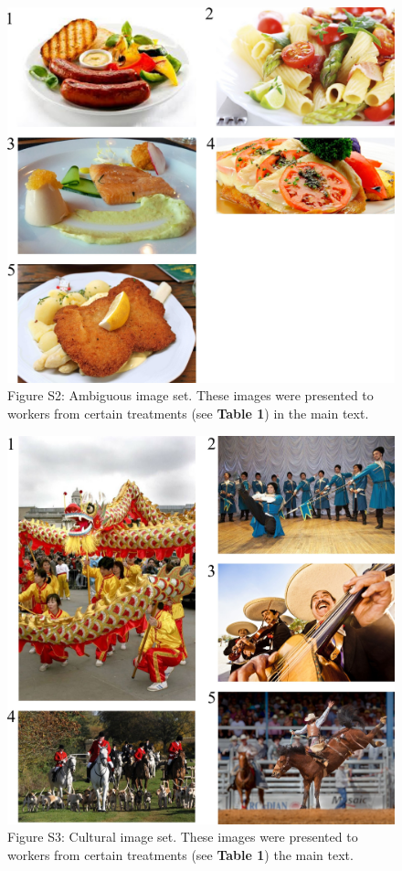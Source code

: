 \documentclass[letterpaper]{article}
\begin{document}
\begin{figure}
	\includegraphics[scale=1.00]{figs/taskImages/ambiguous.jpg}
	\caption*{Figure S2: Ambiguous image set. These images were presented to workers from 
		certain treatments (see \textbf{Table 1}) in the main text.}
\end{figure}

\begin{figure}
	\includegraphics[scale=1.00]{figs/taskImages/cultural.jpg}
	\caption*{Figure S3: Cultural image set. These images were presented to workers from 
		certain treatments (see \textbf{Table 1}) the main text.}
\end{figure}
\end{document}
